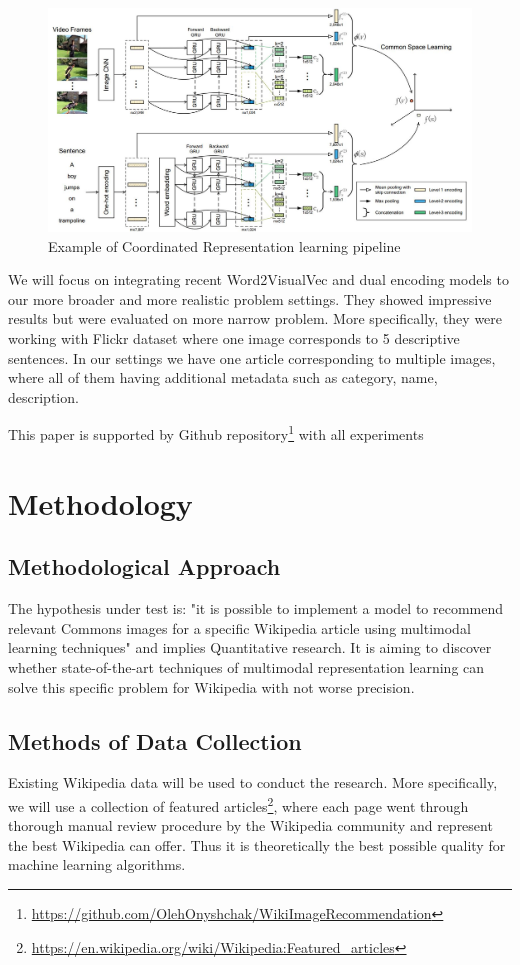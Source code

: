 \documentclass[runningheads]{llncs}
\begin{document}
\begin{figure}
\includegraphics[width=\textwidth]{dual_encoding.jpg}
\caption{Example of Coordinated Representation learning pipeline\cite{ref_dual_encoding}} \label{fig2}
\end{figure}

We will focus on integrating recent Word2VisualVec\cite{ref_w2vv} and dual encoding\cite{ref_dual_encoding} models to our more broader and more realistic problem settings. They showed impressive results but were evaluated on more narrow problem. More specifically, they were working with Flickr dataset\cite{ref_flickr} where one image corresponds to 5 descriptive sentences. In our settings we have one article corresponding to multiple images, where all of them having additional metadata such as category, name, description.

This paper is supported by Github repository\footnote{\url{https://github.com/OlehOnyshchak/WikiImageRecommendation}} with all experiments

\section{Methodology}
\subsection{Methodological Approach}
The hypothesis under test is: "it is possible to implement a model to recommend relevant Commons\cite{ref_wiki_commons} images for a specific Wikipedia article using multimodal learning techniques" and implies Quantitative research. It is aiming to discover whether state-of-the-art techniques of multimodal representation learning can solve this specific problem for Wikipedia with not worse precision. 

\subsection{Methods of Data Collection}
Existing Wikipedia data will be used to conduct the research. More specifically, we will use a collection of featured articles\footnote{\url{https://en.wikipedia.org/wiki/Wikipedia:Featured_articles}}, where each page went through thorough manual review procedure by the Wikipedia community and represent the best Wikipedia can offer. Thus it is theoretically the best possible quality for machine learning algorithms.
\end{document}
